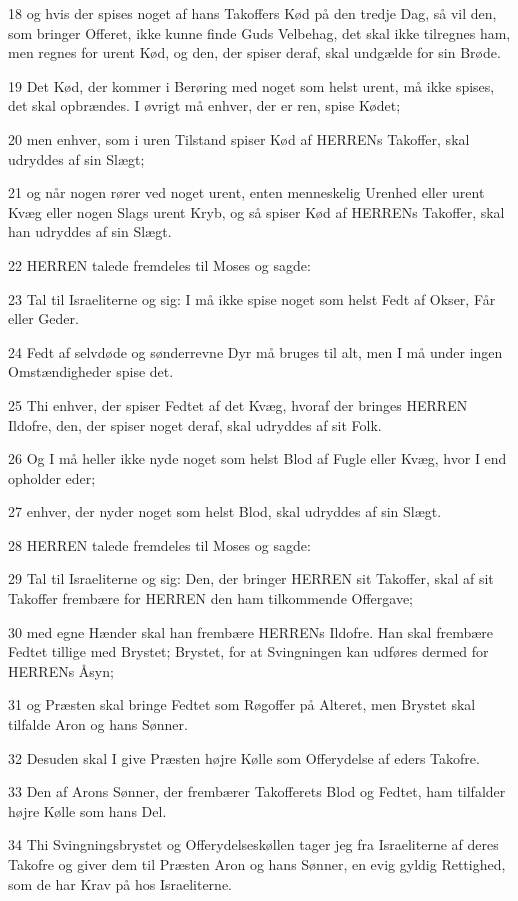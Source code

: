 \par 18 og hvis der spises noget af hans Takoffers Kød på den tredje Dag, så vil den, som bringer Offeret, ikke kunne finde Guds Velbehag, det skal ikke tilregnes ham, men regnes for urent Kød, og den, der spiser deraf, skal undgælde for sin Brøde.
\par 19 Det Kød, der kommer i Berøring med noget som helst urent, må ikke spises, det skal opbrændes. I øvrigt må enhver, der er ren, spise Kødet;
\par 20 men enhver, som i uren Tilstand spiser Kød af HERRENs Takoffer, skal udryddes af sin Slægt;
\par 21 og når nogen rører ved noget urent, enten menneskelig Urenhed eller urent Kvæg eller nogen Slags urent Kryb, og så spiser Kød af HERRENs Takoffer, skal han udryddes af sin Slægt.
\par 22 HERREN talede fremdeles til Moses og sagde:
\par 23 Tal til Israeliterne og sig: I må ikke spise noget som helst Fedt af Okser, Får eller Geder.
\par 24 Fedt af selvdøde og sønderrevne Dyr må bruges til alt, men I må under ingen Omstændigheder spise det.
\par 25 Thi enhver, der spiser Fedtet af det Kvæg, hvoraf der bringes HERREN Ildofre, den, der spiser noget deraf, skal udryddes af sit Folk.
\par 26 Og I må heller ikke nyde noget som helst Blod af Fugle eller Kvæg, hvor I end opholder eder;
\par 27 enhver, der nyder noget som helst Blod, skal udryddes af sin Slægt.
\par 28 HERREN talede fremdeles til Moses og sagde:
\par 29 Tal til Israeliterne og sig: Den, der bringer HERREN sit Takoffer, skal af sit Takoffer frembære for HERREN den ham tilkommende Offergave;
\par 30 med egne Hænder skal han frembære HERRENs Ildofre. Han skal frembære Fedtet tillige med Brystet; Brystet, for at Svingningen kan udføres dermed for HERRENs Åsyn;
\par 31 og Præsten skal bringe Fedtet som Røgoffer på Alteret, men Brystet skal tilfalde Aron og hans Sønner.
\par 32 Desuden skal I give Præsten højre Kølle som Offerydelse af eders Takofre.
\par 33 Den af Arons Sønner, der frembærer Takofferets Blod og Fedtet, ham tilfalder højre Kølle som hans Del.
\par 34 Thi Svingningsbrystet og Offerydelseskøllen tager jeg fra Israeliterne af deres Takofre og giver dem til Præsten Aron og hans Sønner, en evig gyldig Rettighed, som de har Krav på hos Israeliterne.

